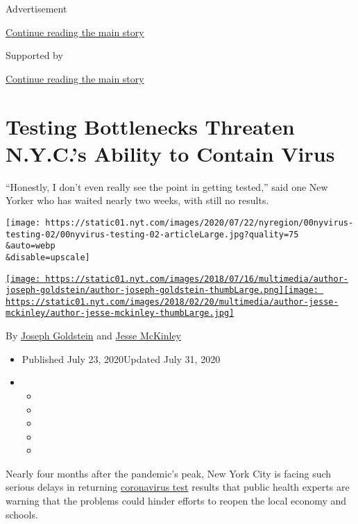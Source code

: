 Advertisement

\protect\hyperlink{after-top}{Continue reading the main story}

Supported by

\protect\hyperlink{after-sponsor}{Continue reading the main story}

\hypertarget{testing-bottlenecks-threaten-nycs-ability-to-contain-virus}{%
\section{Testing Bottlenecks Threaten N.Y.C.'s Ability to Contain
Virus}\label{testing-bottlenecks-threaten-nycs-ability-to-contain-virus}}

``Honestly, I don't even really see the point in getting tested,'' said
one New Yorker who has waited nearly two weeks, with still no results.

\texttt{[image: https://static01.nyt.com/images/2020/07/22/nyregion/00nyvirus-testing-02/00nyvirus-testing-02-articleLarge.jpg?quality=75\\\&auto=webp\\\&disable=upscale]}

\href{https://www.nytimes.com/by/joseph-goldstein}{\texttt{[image: https://static01.nyt.com/images/2018/07/16/multimedia/author-joseph-goldstein/author-joseph-goldstein-thumbLarge.png]}}\href{https://www.nytimes.com/by/jesse-mckinley}{\texttt{[image: https://static01.nyt.com/images/2018/02/20/multimedia/author-jesse-mckinley/author-jesse-mckinley-thumbLarge.jpg]}}

By \href{https://www.nytimes.com/by/joseph-goldstein}{Joseph Goldstein}
and \href{https://www.nytimes.com/by/jesse-mckinley}{Jesse McKinley}

\begin{itemize}
\item
  Published July 23, 2020Updated July 31, 2020
\item
  \begin{itemize}
  \item
  \item
  \item
  \item
  \item
  \end{itemize}
\end{itemize}

Nearly four months after the pandemic's peak, New York City is facing
such serious delays in returning
\href{https://www.nytimes.com/2020/07/31/health/coronavirus-covid-testing.html}{coronavirus
test} results that public health experts are warning that the problems
could hinder efforts to reopen the local economy and schools.

